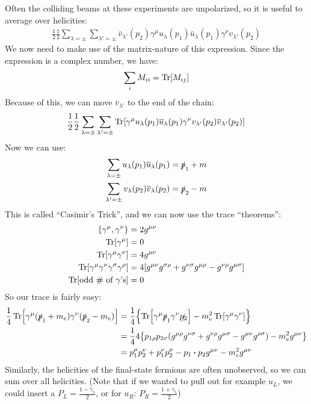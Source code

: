 Often the colliding beams at these experiments are unpolarized, so it is useful to average over helicities:
\begin{align*}
  \frac12\frac12\sum_{\lambda=\pm}\sum_{\lambda'=\pm}
  \bar{v}_{\lambda'}(p_2)\gamma^\mu u_\lambda(p_1)
  \bar{u}_{\lambda}(p_1)\gamma^\nu v_{\lambda'}(p_2)
\end{align*}
We now need to make use of the matrix-nature of this expression. Since the expression is a complex number, we have:
\begin{align*}
  \sum_i M_{ii}=\Tr[M_{ij}]
\end{align*}
Because of this, we can move $\bar{v}_{\lambda'}$ to the end of the chain:
\begin{align*}
  \frac12\frac12\sum_{\lambda=\pm}\sum_{\lambda'=\pm}\Tr[
  \gamma^\mu u_\lambda(p_1)\overline{u}_{\lambda}(p_1)
  \gamma^\nu v_{\lambda'}(p_2)\overline{v}_{\lambda'}(p_2)]
\end{align*}
Now we can use:
\begin{align*}
  \sum_{\lambda=\pm}u_\lambda(p_1)\overline{u}_\lambda(p_1)&=\slashed{p}_1+m\\
  \sum_{\lambda'=\pm}v_\lambda(p_2)\overline{v}_\lambda(p_2)&=\slashed{p}_2-m
\end{align*}
This is called ``Casimir's Trick'', and we can now use the trace ``theorems'':
\begin{align*}
  \acomm{\gamma^\mu}{\gamma^\nu}&=2g^{\mu\nu}\\
  \Tr[\gamma^\mu]&=0\\
  \Tr[\gamma^\mu\gamma^\nu]&=4g^{\mu\nu}\\
  \Tr[\gamma^\mu\gamma^\nu\gamma^\sigma\gamma^\rho]&=
  4[g^{\mu\nu}g^{\sigma\rho}+g^{\nu\sigma}g^{\mu\rho}-g^{\nu\rho}g^{\mu\sigma}]\\
  \Tr[\text{odd \# of $\gamma$'s}]&=0
\end{align*}
So our trace is fairly easy:
\begin{align*}
  \frac14\Tr[\gamma^\mu(\sla{p}_1+m_e)\gamma^\nu(\sla{p}_2-m_e)]
  &=\frac14\qty{\Tr[\gamma^\mu\sla{p}_1\gamma^\nu\sla{p_2}]
    -m_e^2\Tr[\gamma^\mu\gamma^\nu]}\\
  &=\frac144\qty{p_{1\rho}p_{2\sigma}
    (g^{\mu\rho}g^{\nu\sigma}+g^{\nu\rho}g^{\mu\sigma}-g^{\mu\nu}g^{\rho\sigma})
    -m_e^2g^{\mu\nu}}\\
  &=p_1^\mu p_2^\nu+p_1^\nu p_2^\mu-p_1\vdot p_2g^{\mu\nu}-m_e^2g^{\mu\nu}
\end{align*}
Similarly, the helicities of the final-state fermions are often unobserved, so we can sum over all helicities. (Note that if we wanted to pull out for example $u_L$, we could insert a $P_L=\frac{1-\gamma_5}2$, or for $u_R$: $P_R=\frac{1+\gamma_5}2$)
